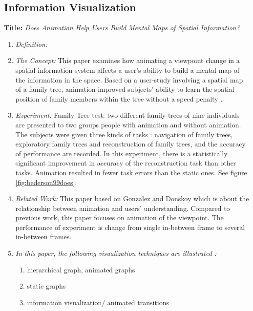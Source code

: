 \documentclass{egpubl}
\begin{document}
\subsection{Information Visualization}
\textbf{Title:} \textit{Does Animation Help Users Build Mental Maps of Spatial Information?}
\begin{enumerate}
\item \textit{Definition:} 
\item \textit{The Concept:} This paper examines how animating a viewpoint change in a spatial information system affects a user's ability to build a mental map of the information in the space. Based on a user-study involving a spatial map of a family tree, animation improved subjects' ability to learn the spatial position of family members within the tree without a speed penalty \cite{bedrson}.
\item \textit{Experiment:} Family Tree test: two different family trees of nine individuals are presented to two groups people with animation and without animation. The subjects were given three kinds of tasks : navigation of family trees, exploratory family trees and reconstruction of family trees, and the accuracy of performance are recorded. In this experiment, there is a statistically significant improvement in accuracy of the reconstruction task than other tasks. Animation resulted in fewer task errors than the static ones. See figure \ref{fig:bederson99does}.
\item \textit{Related Work:} This paper based on Gonzalez \cite{gonzalez} and Donskoy \cite{donskoy} which is about the relationship between animation and users' understanding. Compared to previous work, this paper focuses on animation of the viewpoint. The performance of experiment is change from single in-between frame to several in-between frames.
\item \textit{In this paper, the following visualization techniques are illustrated :} 
\begin{enumerate}
\item hierarchical graph, animated graphs
\item static graphs
\item information visualization/ animated transitions
\end{enumerate}
\end{enumerate}
\end{document}
